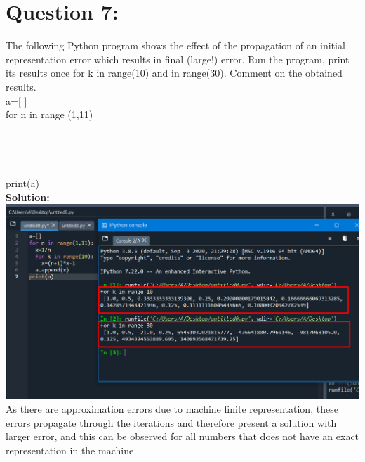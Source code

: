 \documentclass[a4paper,12pt]{article}
\begin{document}
\section*{\LARGE Question 7:}
The following Python program shows the effect of the propagation of an initial representation error which results in final (large!) error. Run the program, print its results once for k in range(10) and in range(30). Comment on the obtained results.\\
a=[  ]\\
for n in range (1,11)\\
 \\
\\
\\
\\
print(a)\\[0.5cm]
 {\color{blue}\textbf{Solution: \\[0.3cm]}}
\includegraphics[width=20cm]{Q7.png}
As there are approximation errors due to machine finite representation, these errors propagate through the iterations and therefore present a solution with larger error, and this can be observed for all numbers that does not have an exact representation in the machine
\newpage
\end{document}
